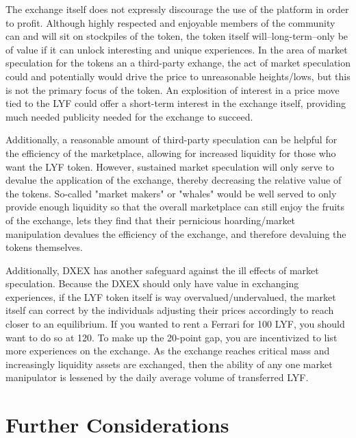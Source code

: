 \documentclass[11pt]{article}
\begin{document}
The exchange itself does not expressly discourage the use of the platform in order to profit. Although highly respected and enjoyable members of the community can and will sit on stockpiles of the token, the token itself will--long-term--only be of value if it can unlock interesting and unique experiences. In the area of market speculation for the tokens an a third-party exhange, the act of market speculation could and potentially would drive the price to unreasonable heights/lows, but this is not the primary focus of the token. An explosition of interest in a price move tied to the LYF could offer a short-term interest in the exchange itself, providing much needed publicity needed for the exchange to succeed.

Additionally, a reasonable amount of third-party speculation can be helpful for the efficiency of the marketplace, allowing for increased liquidity for those who want the LYF token. However, sustained market speculation will only serve to devalue the application of the exchange, thereby decreasing the relative value of the tokens. So-called "market makers" or "whales" would be well served to only provide enough liquidity so that the overall marketplace can still enjoy the fruits of the exchange, lets they find that their pernicious hoarding/market manipulation devalues the efficiency of the exchange, and therefore devaluing the tokens themselves.

Additionally, DXEX has another safeguard against the ill effects of market speculation. Because the DXEX should only have value in exchanging experiences, if the LYF token itself is way overvalued/undervalued, the market itself can correct by the individuals adjusting their prices accordingly to reach closer to an equilibrium. If you wanted to rent a Ferrari for 100 LYF, you should want to do so at 120. To make up the 20-point gap, you are incentivized to list more experiences on the exchange. As the exchange reaches critical mass and increasingly liquidity assets are exchanged, then the ability of any one market manipulator is lessened by the daily average volume of transferred LYF. 

\section{Further Considerations}
\label{sec-5}
\end{document}
